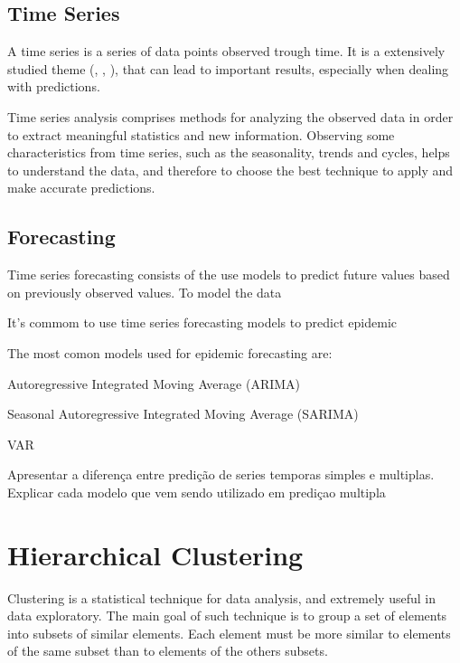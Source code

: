\documentclass[12pt]{report}
\begin{document}
\subsection{Time Series}

A time series is a series of data points observed trough time. It is a extensively studied theme (\citet{box2015time}, \citet{tong1990non}, \citet{scharf1991statistical}), that can lead to important results, especially when dealing with predictions.

Time series analysis comprises methods for analyzing the observed data in order to extract meaningful statistics and new information. Observing some characteristics from time series, such as the seasonality, trends and cycles, helps to understand the data, and therefore to choose the best technique to apply and make accurate predictions.

\subsection{Forecasting}

Time series forecasting consists of the use models to predict future values based on previously observed values. To model the data 

It's commom to use time series forecasting models to predict epidemic
 
The most comon models used for epidemic forecasting are:
 
 \begin{description}
  \item Autoregressive Integrated Moving Average (ARIMA)
  \item Seasonal Autoregressive Integrated Moving Average (SARIMA)
  \item VAR
 \end{description}

Apresentar a diferença entre predição de series temporas simples e multiplas. Explicar cada modelo que vem sendo utilizado em prediçao multipla


\section{Hierarchical Clustering}

Clustering is a statistical technique for data analysis, and extremely useful in data exploratory. The main goal of such technique is to group a set of elements into subsets of similar elements. Each element must be more similar to elements of the same subset than to elements of the others subsets.
\end{document}
